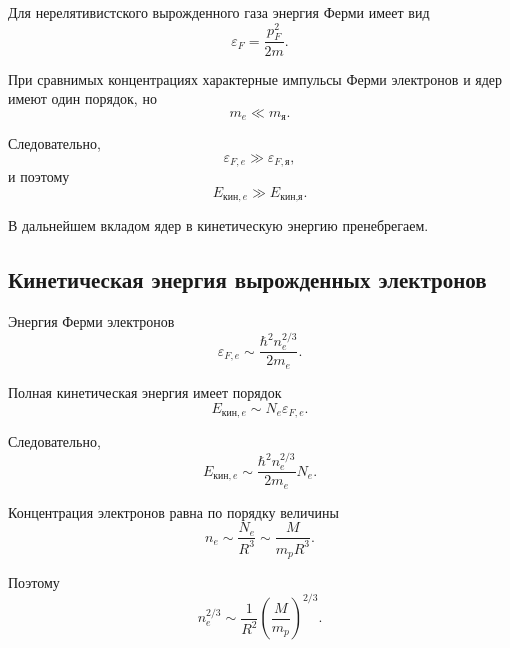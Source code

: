 \documentclass[../final.tex]{subfiles}
\begin{document}
Для нерелятивистского вырожденного газа энергия Ферми имеет вид
%
\begin{equation*}
    \varepsilon_F
    =
    \frac{p_F^2}{2m}.
\end{equation*}

При сравнимых концентрациях характерные импульсы Ферми электронов
и ядер имеют один порядок, но
%
\begin{equation*}
    m_e
    \ll
    m_{\text{я}}.
\end{equation*}

Следовательно,
%
\begin{equation*}
    \varepsilon_{F,e}
    \gg
    \varepsilon_{F,\text{я}},
\end{equation*}
%
и поэтому
%
\begin{equation*}
    E_{\text{кин},e}
    \gg
    E_{\text{кин},\text{я}}.
\end{equation*}

В дальнейшем вкладом ядер в кинетическую энергию пренебрегаем.



\subsection*{Кинетическая энергия вырожденных электронов}

Энергия Ферми электронов
%
\begin{equation*}
    \varepsilon_{F,e}
    \sim
    \frac{\hbar^2n_e^{2/3}}{2m_e}.
\end{equation*}

Полная кинетическая энергия имеет порядок
%
\begin{equation*}
    E_{\text{кин},e}
    \sim
    N_e\varepsilon_{F,e}.
\end{equation*}

Следовательно,
%
\begin{equation*}
    E_{\text{кин},e}
    \sim
    \frac{\hbar^2n_e^{2/3}}{2m_e}
    N_e.
\end{equation*}

Концентрация электронов равна по порядку величины
%
\begin{equation*}
    n_e
    \sim
    \frac{N_e}{R^3}
    \sim
    \frac{M}{m_pR^3}.
\end{equation*}

Поэтому
%
\begin{equation*}
    n_e^{2/3}
    \sim
    \frac{1}{R^2}
    \left(
        \frac{M}{m_p}
    \right)^{2/3}.
\end{equation*}
\end{document}
